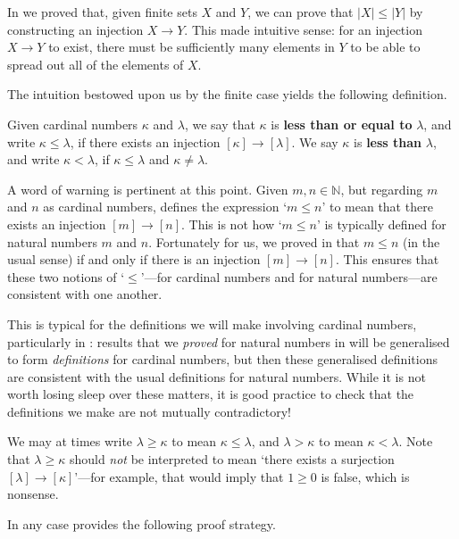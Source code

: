 In  we proved that, given finite sets $X$ and $Y$, we can prove that $|X| \le |Y|$ by constructing an injection $X \to Y$. This made intuitive sense: for an injection $X \to Y$ to exist, there must be sufficiently many elements in $Y$ to be able to spread out all of the elements of $X$.

The intuition bestowed upon us by the finite case yields the following definition.

\begin{definition}
\label{defOrderingOfCardinals}
Given cardinal numbers $\kappa$ and $\lambda$, we say that $\kappa$ is \textbf{less than or equal to} $\lambda$, and write $\kappa \le \lambda$, if there exists an injection $[\kappa] \to [\lambda]$. We say $\kappa$ is \textbf{less than} $\lambda$, and write $\kappa < \lambda$, if $\kappa \le \lambda$ and $\kappa \ne \lambda$.
\end{definition}

A word of warning is pertinent at this point. Given $m,n \in \mathbb{N}$, but regarding $m$ and $n$ as cardinal numbers,  defines the expression `$m \le n$' to mean that there exists an injection $[m] \to [n]$. This is not how `$m \le n$' is typically defined for natural numbers $m$ and $n$. Fortunately for us, we proved in  that $m \le n$ (in the usual sense) if and only if there is an injection $[m] \to [n]$. This ensures that these two notions of `$\le$'---for cardinal numbers and for natural numbers---are consistent with one another.

This is typical for the definitions we will make involving cardinal numbers, particularly in : results that we \textit{proved} for natural numbers in  will be generalised to form \textit{definitions} for cardinal numbers, but then these generalised definitions are consistent with the usual definitions for natural numbers. While it is not worth losing sleep over these matters, it is good practice to check that the definitions we make are not mutually contradictory!

We may at times write $\lambda \ge \kappa$ to mean $\kappa \le \lambda$, and $\lambda > \kappa$ to mean $\kappa < \lambda$. Note that $\lambda \ge \kappa$ should \textit{not} be interpreted to mean `there exists a surjection $[\lambda] \to [\kappa]$'---for example, that would imply that $1 \ge 0$ is false, which is nonsense.

In any case  provides the following proof strategy.

